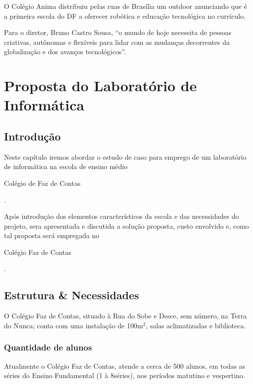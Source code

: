 \documentclass[a4paper,12pt]{report}
\begin{document}
        O Colégio Anima distribuiu pelas ruas de Brasília um outdoor anunciando
        que é a primeira escola do DF a oferecer robótica e educação tecnológica
        no currículo.

        Para o diretor, Bruno Castro Sousa, “o mundo de hoje necessita de
        pessoas criativas, autônomas e flexíveis para lidar com as mudanças
        decorrentes da globalização e dos avanços tecnológicos”.

    \chapter[Laboratório]{Proposta do Laboratório de Informática}
    \label{ch:laboratorio}

        \section{Introdução}
        \label{sc:laboratorio_intro}
        Neste capítulo iremos abordar o estudo de caso para emprego de um
        laboratório de informática na escola de ensino médio
        \begin{bfseries}Colégio de Faz de Contas\end{bfseries}.

        Após introdução dos elementos característicos da escola e das
        necessidades do projeto, sera apresentada e discutida a solução
        proposta, custo envolvido e, como tal proposta será empregada no
        \begin{bfseries}Colégio Faz de Contas\end{bfseries}.

        \section{Estrutura \& Necessidades}
        \label{sc:laboratorio_estrutura}
        O Colégio Faz de Contas, situado à Rua do Sobe e Desce, sem
        número, na Terra do Nunca; conta com uma instalação de
        100m\begin{math}^{2}\end{math}, salas aclimatizadas e biblioteca.

            \subsection{Quantidade de alunos}
            Atualmente o Colégio Faz de Contas, atende a cerca de 500
            alunos, em todas as séries do Ensino Fundamental (1\textordfeminine
            à 8\textordfeminine séries), nos períodos matutino e vespertino.
\end{document}
